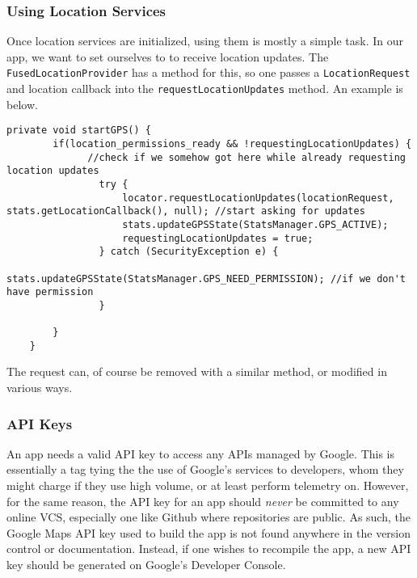 \subsubsection{Using Location Services}
Once location services are initialized, using them is mostly a simple task. In our app, we want to set ourselves to to receive location updates. The 
\verb|FusedLocationProvider| has a method for this, so one passes a \verb|LocationRequest| and location callback into the \verb|requestLocationUpdates| method. An example is
below.
\begin{verbatim}
private void startGPS() {
        if(location_permissions_ready && !requestingLocationUpdates) {
              //check if we somehow got here while already requesting location updates
                try {
                    locator.requestLocationUpdates(locationRequest, stats.getLocationCallback(), null); //start asking for updates
                    stats.updateGPSState(StatsManager.GPS_ACTIVE);
                    requestingLocationUpdates = true;
                } catch (SecurityException e) {
                    stats.updateGPSState(StatsManager.GPS_NEED_PERMISSION); //if we don't have permission
                }

        }
    }
\end{verbatim}
The request can, of course be removed with a similar method, or modified in various ways.\cite{googleLocationServices}

\subsubsection{API Keys}
An app needs a valid API key to access any APIs managed by Google. This is essentially a tag tying the the use of Google's services to developers, whom they might charge if
they use high volume, or at least perform telemetry on. However, for the same reason, the API key for an app should \emph{never} be committed to any online VCS, especially
one like Github where repositories are public. As such, the Google Maps API key used to build the app is not found anywhere in the version control or documentation. Instead,
if one wishes to recompile the app, a new API key should be generated on Google's Developer Console.\cite{googleMapsAPIKey}
